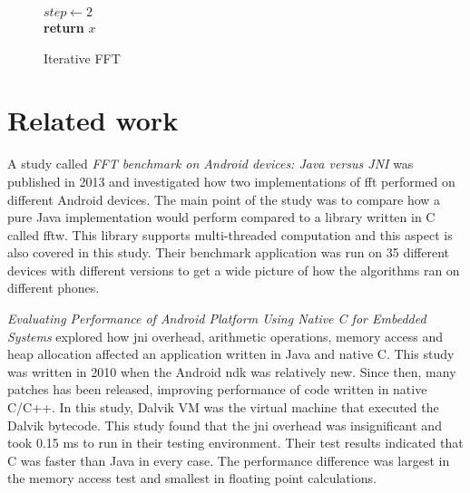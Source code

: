 \begin{figure}[H]
    \begin{algorithm}[H]


        $step \gets 2$\\
        \textbf{return} $x$
        \caption{Iterative FFT}
        \label{alg:fft}
    \end{algorithm}
\end{figure}

\section{Related work}
A study called \emph{FFT benchmark on Android devices: Java versus JNI} \cite{Jr2013} was published in 2013 and investigated how two implementations of \gls{fft} performed on different Android devices. The main point of the study was to compare how a pure Java implementation would perform compared to a library written in C called \gls{fftw}. This library supports multi-threaded computation and this aspect is also covered in this study. Their benchmark application was run on 35 different devices with different versions to get a wide picture of how the algorithms ran on different phones.

\emph{Evaluating Performance of Android Platform Using Native C for Embedded Systems} \cite{Lee2010} explored how \gls{jni} overhead, arithmetic operations, memory access and heap allocation affected an application written in Java and native C. This study was written in 2010 when the Android \gls{ndk} was relatively new. Since then, many patches has been released, improving performance of code written in native C/C++. In this study, Dalvik VM was the virtual machine that executed the Dalvik bytecode. This study found that the \gls{jni} overhead was insignificant and took 0.15 ms to run in their testing environment. Their test results indicated that C was faster than Java in every case. The performance difference was largest in the memory access test and smallest in floating point calculations.

